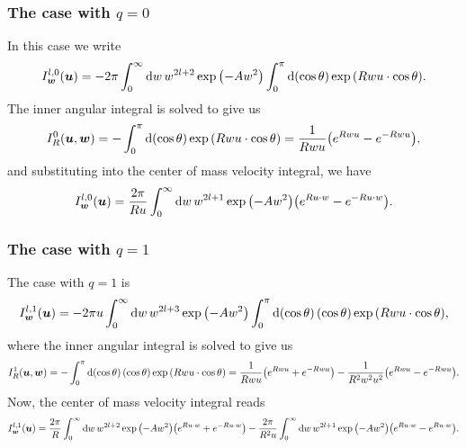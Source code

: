 \documentclass[aps,prl,preprint,groupedaddress,10pt]{revtex4-2}
\begin{document}
\subsubsection{The case with $q=0$}
In this case we write
\begin{equation}
    I_{\bw}^{l,0}(\bu)=-2\pi\int_0^{\infty}\dd{w}w^{2l+2}\exp\pqty{-Aw^2}
    \int_0^{\pi}\dd{\pqty{\cos\theta}}\exp\pqty{Rwu\cdot\cos\theta}.
\end{equation}
The inner angular integral is solved to give us
\begin{equation}
    I^0_R(\bu,\bw)=-\int_0^{\pi}\dd{\pqty{\cos\theta}}\exp\pqty{Rwu\cdot\cos\theta}=
    \frac{1}{Rwu}\pqty{e^{Rwu}-e^{-Rwu}},
\end{equation}
and substituting into the center of mass velocity integral, we have
\begin{equation}
    I_{\bw}^{l,0}(\bu)=\frac{2\pi}{Ru}\int_0^{\infty}\dd{w}w^{2l+1}\exp\pqty{-Aw^2}
    \pqty{e^{Ru\cdot w}-e^{-Ru\cdot w}}.
\end{equation}


\subsubsection{The case with $q=1$}
The case with $q=1$ is
\begin{equation}
    I_{\bw}^{l,1}(\bu)=-2\pi u\int_0^{\infty}\dd{w}w^{2l+3}\exp\pqty{-Aw^2}
    \int_0^{\pi}\dd{\pqty{\cos\theta}}\pqty{\cos\theta}\exp\pqty{Rwu\cdot\cos\theta},
\end{equation}
where the inner angular integral is solved to give us
\begin{equation}
    I_R^{1}(\bu,\bw)=-\int_0^{\pi}\dd{\pqty{\cos\theta}}\pqty{\cos\theta}
    \exp\pqty{Rwu\cdot\cos\theta}=\frac{1}{Rwu}\pqty{e^{Rwu}+e^{-Rwu}}-
    \frac{1}{R^2w^2u^2}\pqty{e^{Rwu}-e^{-Rwu}}.
\end{equation}
Now, the center of mass velocity integral reads
\begin{equation}
    I_{\bw}^{l,1}(\bu)=\frac{2\pi}{R}\int_0^{\infty}\dd{w}w^{2l+2}\exp\pqty{-Aw^2}
    \pqty{e^{Ru\cdot w}+e^{-Ru\cdot w}}
    -\frac{2\pi}{R^2u}\int_0^{\infty}\dd{w}w^{2l+1}\exp\pqty{-Aw^2}
    \pqty{e^{Ru\cdot w}-e^{Ru\cdot w}}.
\end{equation}
\end{document}
